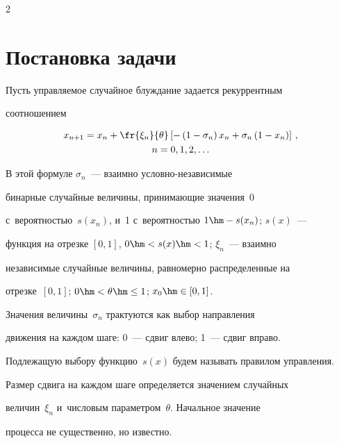 \begin{multicols}{2}
{}


  


  \section{Постановка задачи}


  


  Пусть управляемое случайное блуж\-да\-ние задается рекуррентным 


соотношением


  \begin{multline*}


  x_{n+1}=x_n+\fr{\xi_n}{\theta}\left[ -\left( 1-\sigma_n\right) x_n +\sigma_n 


\left( 1-x_n\right)\right]\,,\\


  n=0,1,2,\ldots


\end{multline*}


    В этой формуле $\sigma_n$~--- взаимно услов\-но-не\-за\-ви\-си\-мые 


бинарные случайные величины, принимающие значения~0 


с~вероятностью~$s(x_n)$, и~1 с~вероятностью $1\hm- s(x_n)$; $s(x)$~--- 


функция на отрезке $[0,1]$, $0\hm< s(x)\hm<1$; $\xi_n$~---  взаимно 


независимые случайные величины, равномерно распределенные на 


отрезке~$[0, 1]$; $0\hm< \theta\hm\leq 1$; $x_0\hm\in 


[0,1]$.


  


  Значения величины~$\sigma_n$ трактуются как выбор на\-прав\-ле\-ния 


движения на каждом шаге: 0~--- сдвиг влево; 1~--- сдвиг вправо. 


Подлежащую выбору функцию~$s(x)$ будем называть правилом управ\-ле\-ния. 


Размер сдвига на каждом шаге определяется значением случайных 


величин~$\xi_n$ и~чис\-ло\-вым па\-ра\-мет\-ром~$\theta$. Начальное значение 


процесса не существенно, но известно.


  



\end{multicols}
